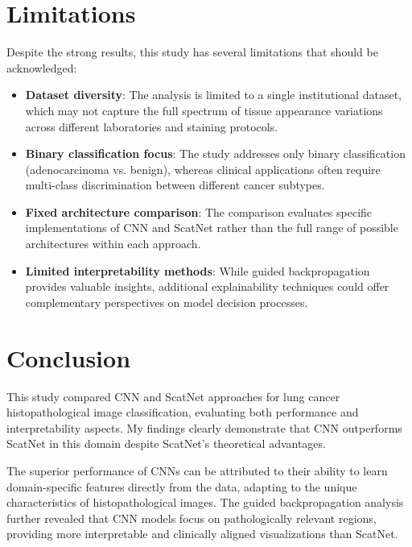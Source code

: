 \documentclass[10pt,twocolumn]{article}
\begin{document}
\section{Limitations}
Despite the strong results, this study has several limitations that should be acknowledged:

\begin{itemize}
    \item \textbf{Dataset diversity}: The analysis is limited to a single institutional dataset, which may not capture the full spectrum of tissue appearance variations across different laboratories and staining protocols.
    
    \item \textbf{Binary classification focus}: The study addresses only binary classification (adenocarcinoma vs. benign), whereas clinical applications often require multi-class discrimination between different cancer subtypes.
    
    \item \textbf{Fixed architecture comparison}: The comparison evaluates specific implementations of CNN and ScatNet rather than the full range of possible architectures within each approach.
    
    \item \textbf{Limited interpretability methods}: While guided backpropagation provides valuable insights, additional explainability techniques could offer complementary perspectives on model decision processes.
\end{itemize}

\section{Conclusion}
This study compared CNN and ScatNet approaches for lung cancer histopathological image classification, evaluating both performance and interpretability aspects. My findings clearly demonstrate that CNN outperforms ScatNet in this domain despite ScatNet's theoretical advantages.

The superior performance of CNNs can be attributed to their ability to learn domain-specific features directly from the data, adapting to the unique characteristics of histopathological images. The guided backpropagation analysis further revealed that CNN models focus on pathologically relevant regions, providing more interpretable and clinically aligned visualizations than ScatNet.
\end{document}
